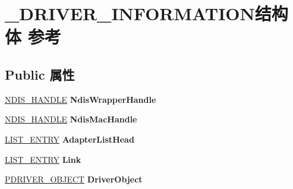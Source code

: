 \hypertarget{struct___d_r_i_v_e_r___i_n_f_o_r_m_a_t_i_o_n}{}\section{\+\_\+\+D\+R\+I\+V\+E\+R\+\_\+\+I\+N\+F\+O\+R\+M\+A\+T\+I\+O\+N结构体 参考}
\label{struct___d_r_i_v_e_r___i_n_f_o_r_m_a_t_i_o_n}
\subsection*{Public 属性}
\begin{DoxyCompactItemize}
\item 
\mbox{\label{struct___d_r_i_v_e_r___i_n_f_o_r_m_a_t_i_o_n_a801945e5f9f0c4ef5c8b5d10d72a38c6}} 
\hyperlink{interfacevoid}{N\+D\+I\+S\+\_\+\+H\+A\+N\+D\+LE} {\bfseries Ndis\+Wrapper\+Handle}
\item 
\mbox{\label{struct___d_r_i_v_e_r___i_n_f_o_r_m_a_t_i_o_n_a3741035ccbeac219297cb2ac1a92818d}} 
\hyperlink{interfacevoid}{N\+D\+I\+S\+\_\+\+H\+A\+N\+D\+LE} {\bfseries Ndis\+Mac\+Handle}
\item 
\mbox{\label{struct___d_r_i_v_e_r___i_n_f_o_r_m_a_t_i_o_n_a746e8cacbfe1a24e62623a94eb5611ee}} 
\hyperlink{struct___l_i_s_t___e_n_t_r_y}{L\+I\+S\+T\+\_\+\+E\+N\+T\+RY} {\bfseries Adapter\+List\+Head}
\item 
\mbox{\label{struct___d_r_i_v_e_r___i_n_f_o_r_m_a_t_i_o_n_a8ea0daa8424484defd29e52fb1dadd39}} 
\hyperlink{struct___l_i_s_t___e_n_t_r_y}{L\+I\+S\+T\+\_\+\+E\+N\+T\+RY} {\bfseries Link}
\item 
\mbox{\label{struct___d_r_i_v_e_r___i_n_f_o_r_m_a_t_i_o_n_ac8263950c46d6759a72eeff64369c6a9}} 
\hyperlink{struct___d_r_i_v_e_r___o_b_j_e_c_t}{P\+D\+R\+I\+V\+E\+R\+\_\+\+O\+B\+J\+E\+CT} {\bfseries Driver\+Object}
\item 
\mbox{\label{struct___d_r_i_v_e_r___i_n_f_o_r_m_a_t_i_o_n_a52cdbb2321c92acc8c088feba060a956}} 

\end{DoxyCompactItemize}
